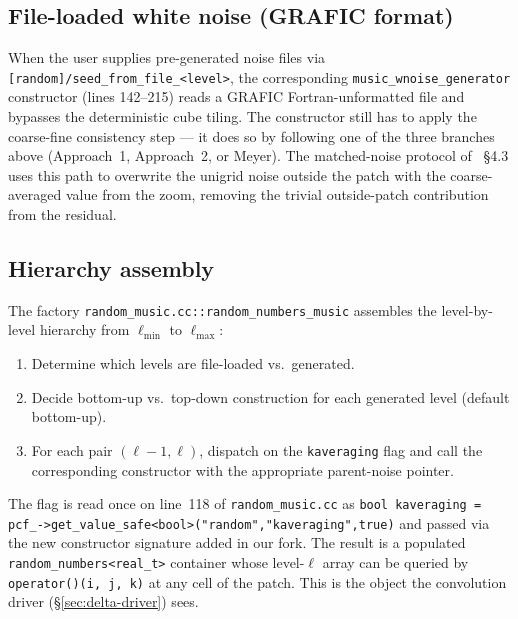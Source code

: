 \documentclass[12pt]{article}
\newcommand{\code}[1]{\texttt{#1}}
\begin{document}
\subsection{File-loaded white noise (GRAFIC format)}
\label{sec:noise-fileloaded}

When the user supplies pre-generated noise files via
\code{[random]/seed\_from\_file\_<level>}, the corresponding
\code{music\_wnoise\_generator} constructor (lines 142--215) reads a
GRAFIC Fortran-unformatted file and bypasses the deterministic cube
tiling.  The constructor still has to apply the coarse-fine
consistency step --- it does so by following one of the three
branches above (Approach~1, Approach~2, or Meyer).  The
matched-noise protocol of \citet{Hahn2011}~\S4.3 uses this path to
overwrite the unigrid noise outside the patch with the
coarse-averaged value from the zoom, removing the trivial
outside-patch contribution from the residual.

\subsection{Hierarchy assembly}
\label{sec:noise-assembly}

The factory \code{random\_music.cc::random\_numbers\_music} assembles
the level-by-level hierarchy from $\ell_\mathrm{min}$ to
$\ell_\mathrm{max}$:

\begin{enumerate}
  \item Determine which levels are file-loaded vs.\ generated.
  \item Decide bottom-up vs.\ top-down construction for each
        generated level (default bottom-up).
  \item For each pair $(\ell-1, \ell)$, dispatch on the
        \code{kaveraging} flag and call the corresponding
        constructor with the appropriate parent-noise pointer.
\end{enumerate}

The flag is read once on line~118 of \code{random\_music.cc} as
\code{bool kaveraging = pcf\_->get\_value\_safe<bool>("random","kaveraging",true)}
and passed via the new constructor signature added in our fork.
The result is a populated \code{random\_numbers<real\_t>} container
whose level-$\ell$ array can be queried by \code{operator()(i, j, k)}
at any cell of the patch.  This is the object the convolution
driver (\S\ref{sec:delta-driver}) sees.

\end{document}
